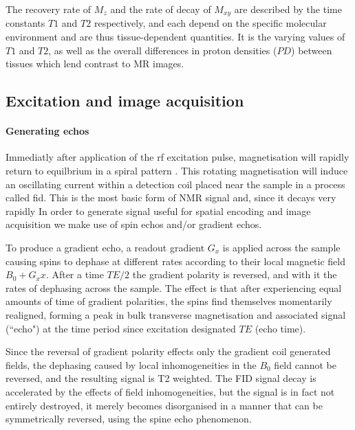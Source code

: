 The recovery rate of $M_z$ and the rate of decay of $M_{xy}$ are described by the time constants $T1$ and $T2$ respectively, and each depend on the specific molecular environment and are thus tissue-dependent quantities.
It is the varying values of $T1$ and $T2$, as well as the overall differences in proton densities ($PD$) between tissues which lend contrast to MR images.

\subsection{Excitation and image acquisition}


\paragraph*{Generating echos}

Immediatly after application of the \gls{rf} excitation pulse, magnetisation will rapidly return to equilbrium in a spiral pattern .
This rotating magnetisation will induce an oscillating current within a detection coil placed near the sample in a process called \gls{fid}.
This is the most basic form of NMR signal and, since it decays very rapidly 
In order to generate signal useful for spatial encoding and image acquisition  we make use of spin echos and/or gradient echos.

To produce a gradient echo, a readout gradient $G_x$  is applied across the sample causing spins to dephase at different rates according to their local magnetic field $B_0 + G_xx$.
After a time $TE/2$  the gradient polarity is reversed, and with it the rates of dephasing across the sample.
The effect is that after experiencing equal amounts of time of gradient polarities, the spins find themselves momentarily realigned, forming a peak in bulk transverse magnetisation and associated signal (``echo") at the time period since excitation designated $TE$ (echo time).

Since the reversal of gradient polarity effects only the gradient coil generated fields, the dephasing caused by local inhomogeneities in the $B_0$ field cannot be reversed, and the resulting signal is T2\* weighted. 
The FID signal decay is accelerated by the effects of field inhomogeneities, but the signal is in fact not entirely destroyed, it merely becomes disorganised in a manner that can be symmetrically reversed, using the spine echo phenomenon.

